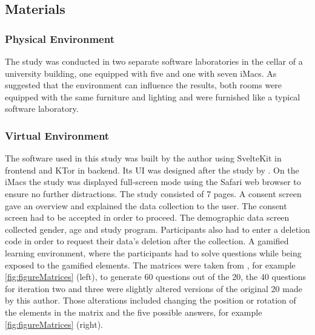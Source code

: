 \subsection{Materials}
\subsubsection{Physical Environment}
The study was conducted in two separate software laboratories in the cellar of a university building, one equipped with five and one with seven iMacs.
As \textcite{christyLeaderboardsVirtualClassroom2014} suggested that the environment can influence the results, both rooms were equipped with the same furniture and lighting and were furnished like a typical software laboratory.

\subsubsection{Virtual Environment}
The software used in this study was built by the author using SvelteKit in frontend and KTor in backend. Its UI was designed after the study by \textcite{albuquerqueDoesGenderStereotype2017}.
On the iMacs the study was displayed full-screen mode using the Safari web browser to ensure no further distractions. The study consisted of 7 pages.
A consent screen gave an overview and explained the data collection to the user. The consent screen had to be accepted in order to proceed.
The demographic data screen collected gender, age and study program. Participants also had to enter a deletion code in order to request their data's deletion after the collection.
A gamified learning environment, where the participants had to solve questions while being exposed to the gamified elements.
The matrices were taken from \textcite{albuquerqueDoesGenderStereotype2017}, for example \autoref{fig:figureMatrices} (left), to generate 60 questions out of the 20, the 40 questions for iteration two and three were slightly altered versions of the original 20 made by this author.
Those alterations included changing the position or rotation of the elements in the matrix and the five possible answers, for example \autoref{fig:figureMatrices} (right).
